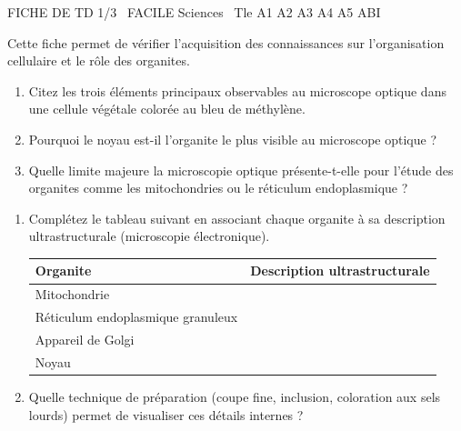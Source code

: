 \documentclass[11pt]{article}
\begin{document}
\begin{tcolorbox}[enhanced,colback=popink,colframe=popink,arc=10pt,boxrule=0pt,left=12pt,right=12pt,top=9pt,bottom=9pt]
{\color{white}\popxbold\small FICHE DE TD 1/3 \textbullet\ FACILE \hfill Sciences \textbullet\ Tle A1 A2 A3 A4 A5 ABI\par}
\end{tcolorbox}
\vspace{4pt}
Cette fiche permet de vérifier l'acquisition des connaissances sur l'organisation cellulaire et le rôle des organites.

\begin{exercice}
\begin{enumerate}
    \item Citez les trois éléments principaux observables au microscope optique dans une cellule végétale colorée au bleu de méthylène.
    \item Pourquoi le noyau est-il l'organite le plus visible au microscope optique ?
    \item Quelle limite majeure la microscopie optique présente-t-elle pour l'étude des organites comme les mitochondries ou le réticulum endoplasmique ?
\end{enumerate}
\end{exercice}

\begin{exercice}
\begin{enumerate}
    \item Complétez le tableau suivant en associant chaque organite à sa description ultrastructurale (microscopie électronique).
    \begin{tabular}{|l|p{8cm}|}
    \hline
    \textbf{Organite} & \textbf{Description ultrastructurale} \\ \hline
    Mitochondrie & \\ \hline
    Réticulum endoplasmique granuleux & \\ \hline
    Appareil de Golgi & \\ \hline
    Noyau & \\ \hline
    \end{tabular}
    \item Quelle technique de préparation (coupe fine, inclusion, coloration aux sels lourds) permet de visualiser ces détails internes ?
\end{enumerate}
\end{exercice}
\end{document}
